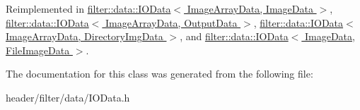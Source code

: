 Reimplemented in \hyperlink{classfilter_1_1data_1_1_i_o_data_a6ad82e2b326a0f436391225daa728458}{filter\+::data\+::\+I\+O\+Data$<$ Image\+Array\+Data, Image\+Data $>$}, \hyperlink{classfilter_1_1data_1_1_i_o_data_a6ad82e2b326a0f436391225daa728458}{filter\+::data\+::\+I\+O\+Data$<$ Image\+Array\+Data, Output\+Data $>$}, \hyperlink{classfilter_1_1data_1_1_i_o_data_a6ad82e2b326a0f436391225daa728458}{filter\+::data\+::\+I\+O\+Data$<$ Image\+Array\+Data, Directory\+Img\+Data $>$}, and \hyperlink{classfilter_1_1data_1_1_i_o_data_a6ad82e2b326a0f436391225daa728458}{filter\+::data\+::\+I\+O\+Data$<$ Image\+Data, File\+Image\+Data $>$}.



The documentation for this class was generated from the following file\+:\begin{DoxyCompactItemize}
\item 
header/filter/data/I\+O\+Data.\+h\end{DoxyCompactItemize}
